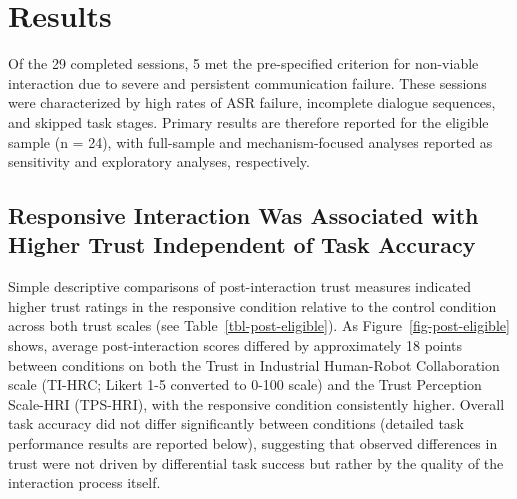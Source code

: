 \documentclass[
  authoryear,
  doubleblind,
  3p]{elsarticle}
\begin{document}
\section{Results}\label{results}

Of the 29 completed sessions, 5 met the pre-specified criterion for
non-viable interaction due to severe and persistent communication
failure. These sessions were characterized by high rates of ASR failure,
incomplete dialogue sequences, and skipped task stages. Primary results
are therefore reported for the eligible sample (n = 24), with
full-sample and mechanism-focused analyses reported as sensitivity and
exploratory analyses, respectively.

\subsection{Responsive Interaction Was Associated with Higher Trust
Independent of Task
Accuracy}\label{responsive-interaction-was-associated-with-higher-trust-independent-of-task-accuracy}

Simple descriptive comparisons of post-interaction trust measures
indicated higher trust ratings in the responsive condition relative to
the control condition across both trust scales (see
Table~\ref{tbl-post-eligible}). As Figure~\ref{fig-post-eligible} shows,
average post-interaction scores differed by approximately 18 points
between conditions on both the Trust in Industrial Human-Robot
Collaboration scale (TI-HRC; Likert 1-5 converted to 0-100 scale) and
the Trust Perception Scale-HRI (TPS-HRI), with the responsive condition
consistently higher. Overall task accuracy did not differ significantly
between conditions (detailed task performance results are reported
below), suggesting that observed differences in trust were not driven by
differential task success but rather by the quality of the interaction
process itself.
\end{document}

